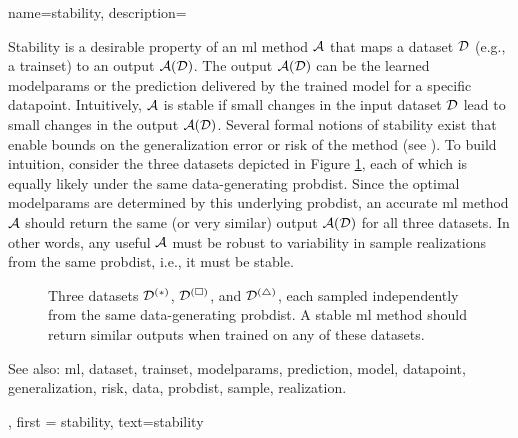 {name={stability},
	description={
		Stability is a desirable property of an \gls{ml} method $\mathcal{A}$ that maps a 
		\gls{dataset} $\mathcal{D}$ (e.g., a \gls{trainset}) to an output $\mathcal{A}(\mathcal{D})$. The output 
		$\mathcal{A}(\mathcal{D})$ can be the learned \gls{modelparams} or the \gls{prediction} delivered 
		by the trained \gls{model} for a specific \gls{datapoint}. Intuitively, $\mathcal{A}$ is 
		stable if small changes in the input \gls{dataset} $\mathcal{D}$ lead to small changes in the 
		output $\mathcal{A}(\mathcal{D})$. Several formal notions of stability exist that enable bounds 
		on the \gls{generalization} error or \gls{risk} of the method (see \cite[Ch.~13]{ShalevMLBook}).
		To build intuition, consider the three \glspl{dataset} depicted in Figure \ref{fig_three_data_stability_dict}, each 
		of which is equally likely under the same \gls{data}-generating \gls{probdist}. Since the 
		optimal \gls{modelparams} are determined by this underlying \gls{probdist}, an accurate 
		\gls{ml} method $\mathcal{A}$ should return the same (or very similar) output $\mathcal{A}(\mathcal{D})$ 
		for all three \glspl{dataset}. In other words, any useful $\mathcal{A}$ must be robust to 
		variability in \gls{sample} \glspl{realization} from the same \gls{probdist}, i.e., it must be stable. 
		\begin{figure}[H]
			\centering
			\caption{Three \glspl{dataset} $\mathcal{D}^{(*)}$, $\mathcal{D}^{(\square)}$, and $\mathcal{D}^{(\triangle)}$, 
				each sampled independently from the same \gls{data}-generating \gls{probdist}. A stable \gls{ml} 
				method should return similar outputs when trained on any of these \glspl{dataset}. 
				\label{fig_three_data_stability_dict}}
		\end{figure}
		See also: \gls{ml}, \gls{dataset}, \gls{trainset}, \gls{modelparams}, \gls{prediction}, \gls{model}, \gls{datapoint}, \gls{generalization}, \gls{risk}, \gls{data}, \gls{probdist}, \gls{sample}, \gls{realization}.
		}, 
	first = {stability}, 
	text={stability} 
}

